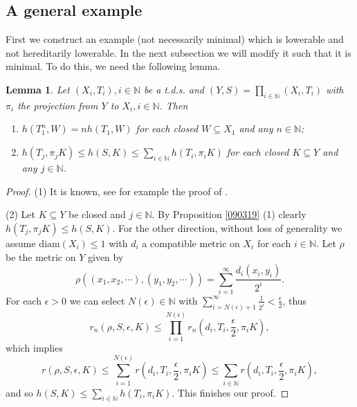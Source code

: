 \documentclass[12pt]{amsart}
\newtheorem{lem}[thm]{Lemma}
\theoremstyle{definition} \theoremstyle{question}
\numberwithin{equation}{section}
\begin{document}
\subsection{A general example} First we construct an example (not necessarily minimal) which
is lowerable and not hereditarily lowerable. In the next subsection
we will modify it such that it is minimal. To do this, we need the
following lemma.

\begin{lem} \label{prod0}
Let $(X_i, T_i), i\in {\mathbb N}$ be a t.d.s. and $(Y, S)=
\prod\limits_{i\in {\mathbb N}} (X_i, T_i)$ with $\pi_i$ the projection from
$Y$ to $X_i, i\in {\mathbb N}$. Then
\begin{enumerate}

\item $h (T_1^n, W)= n h (T_1, W)$ for each closed $W\subseteq X_1$
 and any $n\in {\mathbb N}$;

\item $h (T_j, \pi_j K)\le h (S, K)\le \sum_{i\in {\mathbb N}} h(T_i, \pi_i K)$
for each closed $K\subseteq Y$ and any $j\in {\mathbb N}$.
\end{enumerate}
\end{lem}
\begin{proof}
(1) It is known, see for example the proof of \cite[Theorem 7.10
(i)]{Wa}.

(2) Let $K\subseteq Y$ be closed and $j\in {\mathbb N}$. By Proposition
\ref{090319} (1) clearly $h (T_j, \pi_j K)\le h (S, K)$. For the
other direction, without loss of generality we assume
$\text{diam} (X_i)\le 1$ with $d_i$ a compatible metric on $X_i$ for
each $i\in{\mathbb N}$. Let $\rho$ be the metric on $Y$ given by
\begin{equation*}
\rho ((x_1, x_2, \cdots), (y_1, y_2, \cdots))= \sum_{i= 1}^\infty
\frac{d_i (x_i, y_i)}{2^i}.
\end{equation*}
For each $\epsilon> 0$ we can select $N (\epsilon)\in {\mathbb N}$ with
$\sum_{i= N (\epsilon)+ 1}^\infty \frac{1}{2^i}<
\frac{\epsilon}{2}$, thus
\begin{equation*}
r_n (\rho, S, \epsilon, K)\le \prod_{i= 1}^{N (\epsilon)} r_n (d_i,
T_i, \frac{\epsilon}{2}, \pi_i K),
\end{equation*}
which implies
\begin{equation*}
r(\rho, S, \epsilon, K)\le \sum_{i= 1}^{N (\epsilon)} r (d_i, T_i,
\frac{\epsilon}{2}, \pi_i K)\le \sum_{i\in {\mathbb N}} r(d_i, T_i,
\frac{\epsilon}{2}, \pi_i K),
\end{equation*}
and so $h (S, K)\le \sum_{i\in {\mathbb N}} h (T_i, \pi_i K)$. This finishes
our proof.
\end{proof}
\end{document}
